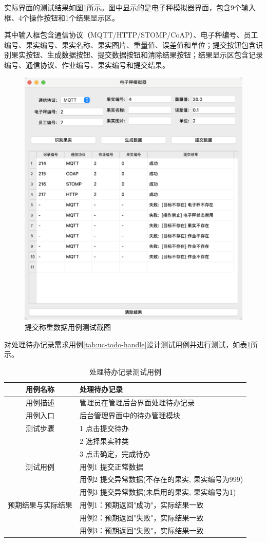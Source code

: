 实际界面的测试结果如图\ref{fig:weigh-submit-result}所示。图中显示的是电子秤模拟器界面，包含9个输入框、4个操作按钮和1个结果显示区。

其中输入框包含通信协议（MQTT/HTTP/STOMP/CoAP）、电子秤编号、员工编号、果实编号、果实名称、果实图片、重量值、误差值和单位；提交按钮包含识别果实按钮、生成数据按钮、提交数据按钮和清除结果按钮；结果显示区包含记录编号、通信协议、作业编号、果实编号和提交结果。

\begin{figure}[H]
    \centering
    \includegraphics[width=0.8\linewidth]{../result/weigh-submit-result.png}
    \caption{提交称重数据用例测试截图}
    \label{fig:weigh-submit-result}
\end{figure}

对处理待办记录需求用例\ref{tab:uc-todo-handle}设计测试用例并进行测试，如表\ref{tab:uc-todo-handle-test}所示。

\begin{longtable}[ht]{|c|p{8cm}|}
\caption{处理待办记录测试用例}
\label{tab:uc-todo-handle-test}
\\
\hline
用例名称 & 处理待办记录 \\
\hline
用例描述 & 管理员在管理后台界面处理待办记录 \\
\hline
用例入口 & 后台管理界面中的待办管理模块 \\
\hline
测试步骤 & 1 点击提交待办 \\
& 2 选择果实种类 \\
& 3 点击确定，完成待办 \\
\hline
测试用例 & 用例1 提交正常数据 \\
& 用例2 提交异常数据(不存在的果实, 果实编号为999) \\
& 用例3 提交异常数据(未启用的果实, 果实编号为1) \\
\hline
预期结果与实际结果 & 用例1：预期返回"成功"，实际结果一致 \\
& 用例2：预期返回"失败"，实际结果一致 \\
& 用例3：预期返回"失败"，实际结果一致 \\
\hline
\end{longtable}

